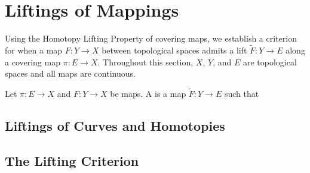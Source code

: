 \documentclass[../Moduli_Spaces_of_Riemann_Surfaces.tex]{subfiles}
\begin{document}
    \section{Liftings of Mappings}\label{CS:sec:lifting_criterion}
    Using the Homotopy Lifting Property of covering maps, we establish a criterion for when a map $F:Y\to X$ between topological spaces admits a lift $\widetilde{F}:Y\to E$ along a covering map $\pi:E\to X$. Throughout this section, $X$, $Y$, and $E$ are topological spaces and all maps are continuous.
    \begin{definition}
        Let $\pi:E\to X$ and $F:Y\to X$ be maps. A  is a map $\widetilde{F}:Y\to E$ such that
    \end{definition}
    \subsection{Liftings of Curves and Homotopies}
    \begin{proposition}
        
    \end{proposition}
    \subsection{The Lifting Criterion}
    \begin{lemma}
        
    \end{lemma}
    \begin{proposition}
        
    \end{proposition}
\end{document}
